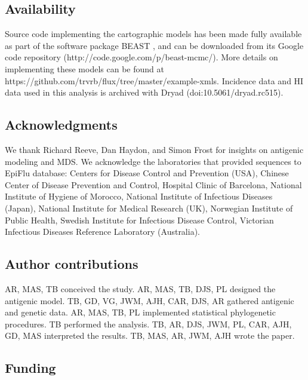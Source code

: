 \documentclass[11pt,oneside,letterpaper]{article}
\begin{document}
\subsection*{Availability}

Source code implementing the cartographic models has been made fully available as part of the software package BEAST \cite{BEAST17}, and can be downloaded from its Google code repository (http://code.google.com/p/beast-mcmc/).
More details on implementing these models can be found at https://github.com/trvrb/flux/tree/master/example-xmls.
Incidence data and HI data used in this analysis is archived with Dryad (doi:10.5061/dryad.rc515).

\subsection*{Acknowledgments} 

We thank Richard Reeve, Dan Haydon, and Simon Frost for insights on antigenic modeling and MDS.
We acknowledge the laboratories that provided sequences to EpiFlu database: Centers for Disease Control and Prevention (USA), Chinese Center of Disease Prevention and Control, Hospital Clinic of Barcelona, National Institute of Hygiene of Morocco, National Institute of Infectious Diseases (Japan), National Institute for Medical Research (UK), Norwegian Institute of Public Health, Swedish Institute for Infectious Disease Control, Victorian Infectious Diseases Reference Laboratory (Australia).

\subsection*{Author contributions} 

AR, MAS, TB conceived the study.
AR, MAS, TB, DJS, PL designed the antigenic model.
TB, GD, VG, JWM, AJH, CAR, DJS, AR gathered antigenic and genetic data.
AR, MAS, TB, PL implemented statistical phylogenetic procedures.
TB performed the analysis.
TB, AR, DJS, JWM, PL, CAR, AJH, GD, MAS interpreted the results.
TB, MAS, AR, JWM, AJH wrote the paper.

\subsection*{Funding} 
\end{document}
